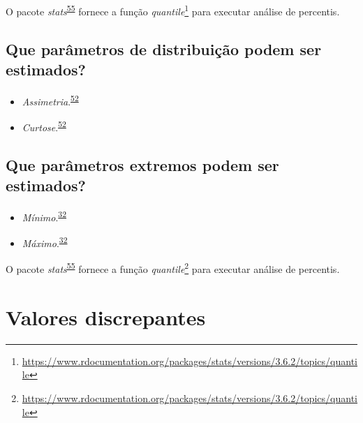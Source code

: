 \documentclass[
]{book}
\renewcommand{\href}[2]{#2\footnote{\url{#1}}}
\newenvironment{infobox}[1]
  {
  \begin{itemize}
  \renewcommand{\labelitemi}{
    \raisebox{-.7\height}[0pt][0pt]{
      {\setkeys{Gin}{width=3em,keepaspectratio}
        \texttt{[image: \#1]}}
    }
  }
  \setlength{\fboxsep}{1em}
  \begin{blackbox}
  \item
  }
  {
  \end{blackbox}
  \end{itemize}
  }
\begin{document}
\begin{infobox}{images/Rlogo}
O pacote \emph{stats}\textsuperscript{\protect\hyperlink{ref-base}{55}} fornece a função \href{https://www.rdocumentation.org/packages/stats/versions/3.6.2/topics/quantile}{\emph{quantile}} para executar análise de percentis.

\end{infobox}

\hypertarget{que-paruxe2metros-de-distribuiuxe7uxe3o-podem-ser-estimados}{%
\subsection{Que parâmetros de distribuição podem ser estimados?}\label{que-paruxe2metros-de-distribuiuxe7uxe3o-podem-ser-estimados}}

\begin{itemize}
\item
  \emph{Assimetria}.\textsuperscript{\protect\hyperlink{ref-kanji2006}{52}}
\item
  \emph{Curtose}.\textsuperscript{\protect\hyperlink{ref-kanji2006}{52}}
\end{itemize}

\hypertarget{que-paruxe2metros-extremos-podem-ser-estimados}{%
\subsection{Que parâmetros extremos podem ser estimados?}\label{que-paruxe2metros-extremos-podem-ser-estimados}}

\begin{itemize}
\item
  \emph{Mínimo}.\textsuperscript{\protect\hyperlink{ref-Ali2016}{32}}
\item
  \emph{Máximo}.\textsuperscript{\protect\hyperlink{ref-Ali2016}{32}}
\end{itemize}

\begin{infobox}{images/Rlogo}
O pacote \emph{stats}\textsuperscript{\protect\hyperlink{ref-base}{55}} fornece a função \href{https://www.rdocumentation.org/packages/stats/versions/3.6.2/topics/quantile}{\emph{quantile}} para executar análise de percentis.

\end{infobox}

\hypertarget{outliers}{%
\section{Valores discrepantes}\label{outliers}}
\end{document}
